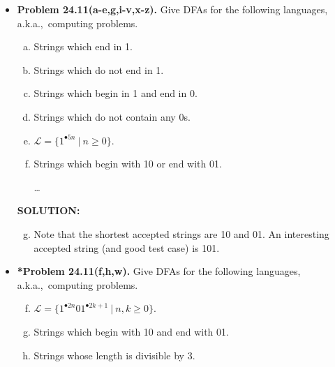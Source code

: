 \documentclass[11pt]{article}
\begin{document}
\begin{itemize}
\newpage

\item \textbf{Problem 24.11(a-e,g,i-v,x-z).}
Give DFAs for the following languages, a.k.a.,~computing problems.
\begin{enumerate}[(a)]
\item Strings which end in 1.
\item Strings which do not end in 1.
\item Strings which begin in 1 and end in 0.
\item Strings which do not contain any 0s.
\item $\mathcal{L}=\{1^{\bullet 5n}\ |\ n\ge 0\}$.
\setcounter{enumi}{6}
\item Strings which begin with 10 or end with 01.

\ldots
\end{enumerate}

\vspace{0.1in}
\textbf{SOLUTION:}
\begin{enumerate}[(a)]
\setcounter{enumi}{6}
\item Note that the shortest accepted strings are 10 and 01.
  An interesting accepted string (and good test case) is 101.

\end{enumerate}

\vspace{0.2in}

\item \textbf{*Problem 24.11(f,h,w).}
Give DFAs for the following languages, a.k.a.,~computing problems.
\begin{enumerate}[(a)]
\setcounter{enumi}{5}
\item $\mathcal{L}=\{1^{\bullet 2n}01^{\bullet 2k+1}\ |\ n,k\ge 0\}$.
\setcounter{enumi}{7}
\item Strings which begin with 10 and end with 01.
\setcounter{enumi}{22}
\item Strings whose length is divisible by 3.
\end{enumerate}


\end{itemize}
\end{document}
